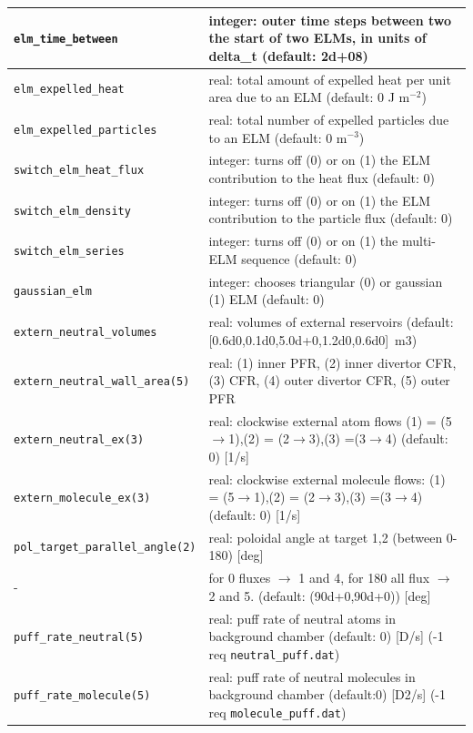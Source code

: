 \documentclass[amsmath,amssymb,a4]{revtex4-2}
\begin{document}
\begin{longtable}{| p{} | p{} |}
    {\tt elm\_time\_between}     & integer: outer time steps between two the start of two ELMs, in units of delta\_t (default: 2d+08) \\ \hline
    {\tt elm\_expelled\_heat}    & real: total amount of expelled heat per unit area due to an ELM (default: 0 J m$^{-2}$) \\ \hline
    {\tt elm\_expelled\_particles}& real: total number of expelled particles due to an ELM (default: 0 m$^{-3}$) \\ \hline
    {\tt switch\_elm\_heat\_flux}& integer: turns off (0) or on (1) the ELM contribution to the heat flux (default: 0) \\ \hline
    {\tt switch\_elm\_density}   & integer: turns off (0) or on (1) the ELM contribution to the particle flux (default: 0) \\ \hline
    {\tt switch\_elm\_series}    & integer: turns off (0) or on (1) the multi-ELM sequence (default: 0) \\ \hline
    {\tt gaussian\_elm}          & integer: chooses triangular (0) or gaussian (1) ELM (default: 0) \\ \hline
    {\tt extern\_neutral\_volumes }   & real: volumes of external reservoirs (default: [0.6d0,0.1d0,5.0d+0,1.2d0,0.6d0]~m3)\\ \hline 
    {\tt extern\_neutral\_wall\_area(5)} & real: (1) inner PFR, (2) inner divertor CFR, (3) CFR, (4) outer divertor CFR, (5) outer PFR \\ \hline
    {\tt  extern\_neutral\_ex(3) }    & real: clockwise external atom flows (1) = (5$\rightarrow$1),(2) = (2$\rightarrow$3),(3) =(3$\rightarrow$4) (default: 0)  [1/s]  \\ \hline
    {\tt extern\_molecule\_ex(3)} & real: clockwise external molecule flows: (1) = (5$\rightarrow$1),(2) = (2$\rightarrow$3),(3) =(3$\rightarrow$4)  (default: 0)  [1/s]    \\ \hline
    {\tt  pol\_target\_parallel\_angle(2)} & real: poloidal angle at target 1,2 (between 0-180) [deg]  \\ \hline 
    {-} & for 0 fluxes $\rightarrow$ 1 and 4, for 180 all flux $\rightarrow$ 2 and 5. (default:  (90d+0,90d+0)) [deg] \\ \hline
    {\tt  puff\_rate\_neutral(5) } & real: puff rate of neutral atoms in background chamber (default: 0) [D/s] (-1 req {\tt neutral\_puff.dat}) \\ \hline
    {\tt puff\_rate\_molecule(5) }      & real: puff rate of neutral molecules in background chamber (default:0) [D2/s] (-1 req {\tt molecule\_puff.dat}) \\ \hline

\end{longtable}
\end{document}
